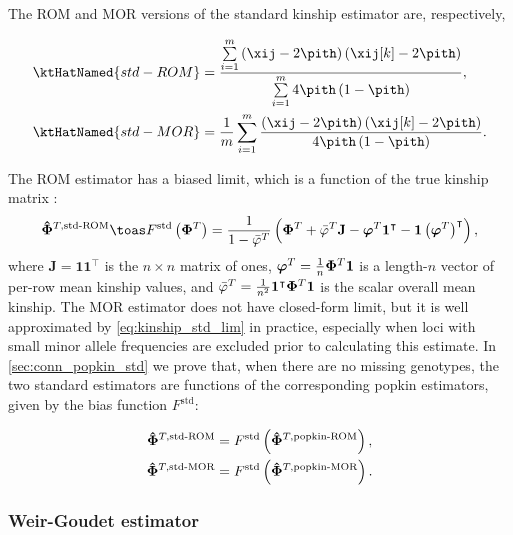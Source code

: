 \documentclass[11pt]{article}
\newcommand{\kinMat}[1][T]{%
  \ensuremath{%
    \mathbf{\Phi}^{#1}
  }%
  \xspace%
}%
\newcommand{\kinMatEstNamed}[1]{%
  \ensuremath{%
    \mathbf{\hat{\Phi}}^{T,\text{#1}}
  }%
  \xspace%
}%
\begin{document}
\begin{linenumbers}
The ROM and MOR versions of the standard kinship estimator are, respectively,
\begin{linenomath*}
\begin{align}
  \label{eq:kinship_std_rom}
  \ktHatNamed{std-ROM}
  &=
    \frac{
    \sum\limits_{i=1}^m \left( \xij - 2 \pith \right) \left( \xij[k] - 2 \pith \right)
    }{
    \sum\limits_{i=1}^m 4 \pith \left( 1-\pith \right)
    }
    , \\
  \label{eq:kinship_std_mor}
  \ktHatNamed{std-MOR}
  &=
    \frac{1}{m} \sum\limits_{i=1}^m \frac{\left( \xij - 2 \pith \right) \left( \xij[k] - 2 \pith \right)}{4 \pith \left( 1-\pith \right)}
    .
\end{align}
\end{linenomath*}
The ROM estimator has a biased limit, which is a function of the true kinship matrix \citep{ochoa_estimating_2021}:
\begin{equation}
  \label{eq:kinship_std_lim}
  \kinMatEstNamed{std-ROM}
  \toas
  F^\text{std} \left( \kinMat \right)
  =
  \frac{1}{1 - \bar{\varphi}^T}
  \left(
    \kinMat
    + \bar{\varphi}^T \mathbf{J}
    - \boldsymbol{\varphi}^T \mathbf{1}^\intercal 
    - \mathbf{1} \left( \boldsymbol{\varphi}^T \right)^\intercal 
  \right)
  ,
\end{equation}
where
$\mathbf{J} = \mathbf{1} \mathbf{1}^\intercal$ is the $n \times n$ matrix of ones,
$\boldsymbol{\varphi}^T = \frac{1}{n} \kinMat \mathbf{1}$ is a length-$n$ vector of per-row mean kinship values, and
$\bar{\varphi}^T = \frac{1}{n^2} \mathbf{1}^\intercal \kinMat \mathbf{1}$ is the scalar overall mean kinship.
The MOR estimator does not have closed-form limit, but it is well approximated by \cref{eq:kinship_std_lim} in practice, especially when loci with small minor allele frequencies are excluded prior to calculating this estimate.
In \cref{sec:conn_popkin_std} we prove that, when there are no missing genotypes, the two standard estimators are functions of the corresponding popkin estimators, given by the bias function $F^\text{std}$:
\begin{linenomath*}
\begin{align*}
  \kinMatEstNamed{std-ROM}
  &=
    F^\text{std} \left( \kinMatEstNamed{popkin-ROM} \right)
    , \\
  \kinMatEstNamed{std-MOR}
  &=
    F^\text{std} \left( \kinMatEstNamed{popkin-MOR} \right)
    .
\end{align*}
\end{linenomath*}

\subsubsection{Weir-Goudet estimator}


\end{linenumbers}
\end{document}
